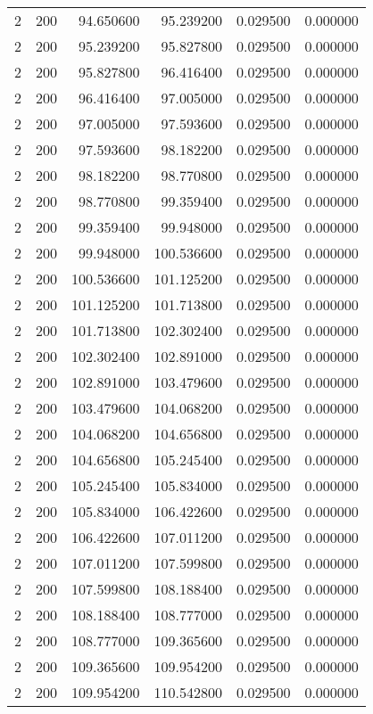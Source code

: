 \begin{longtable}{rrrrrr}
2 & 200 & 94.650600 & 95.239200 & 0.029500 & 0.000000 \\
2 & 200 & 95.239200 & 95.827800 & 0.029500 & 0.000000 \\
2 & 200 & 95.827800 & 96.416400 & 0.029500 & 0.000000 \\
2 & 200 & 96.416400 & 97.005000 & 0.029500 & 0.000000 \\
2 & 200 & 97.005000 & 97.593600 & 0.029500 & 0.000000 \\
2 & 200 & 97.593600 & 98.182200 & 0.029500 & 0.000000 \\
2 & 200 & 98.182200 & 98.770800 & 0.029500 & 0.000000 \\
2 & 200 & 98.770800 & 99.359400 & 0.029500 & 0.000000 \\
2 & 200 & 99.359400 & 99.948000 & 0.029500 & 0.000000 \\
2 & 200 & 99.948000 & 100.536600 & 0.029500 & 0.000000 \\
2 & 200 & 100.536600 & 101.125200 & 0.029500 & 0.000000 \\
2 & 200 & 101.125200 & 101.713800 & 0.029500 & 0.000000 \\
2 & 200 & 101.713800 & 102.302400 & 0.029500 & 0.000000 \\
2 & 200 & 102.302400 & 102.891000 & 0.029500 & 0.000000 \\
2 & 200 & 102.891000 & 103.479600 & 0.029500 & 0.000000 \\
2 & 200 & 103.479600 & 104.068200 & 0.029500 & 0.000000 \\
2 & 200 & 104.068200 & 104.656800 & 0.029500 & 0.000000 \\
2 & 200 & 104.656800 & 105.245400 & 0.029500 & 0.000000 \\
2 & 200 & 105.245400 & 105.834000 & 0.029500 & 0.000000 \\
2 & 200 & 105.834000 & 106.422600 & 0.029500 & 0.000000 \\
2 & 200 & 106.422600 & 107.011200 & 0.029500 & 0.000000 \\
2 & 200 & 107.011200 & 107.599800 & 0.029500 & 0.000000 \\
2 & 200 & 107.599800 & 108.188400 & 0.029500 & 0.000000 \\
2 & 200 & 108.188400 & 108.777000 & 0.029500 & 0.000000 \\
2 & 200 & 108.777000 & 109.365600 & 0.029500 & 0.000000 \\
2 & 200 & 109.365600 & 109.954200 & 0.029500 & 0.000000 \\
2 & 200 & 109.954200 & 110.542800 & 0.029500 & 0.000000 \\

\end{longtable}
